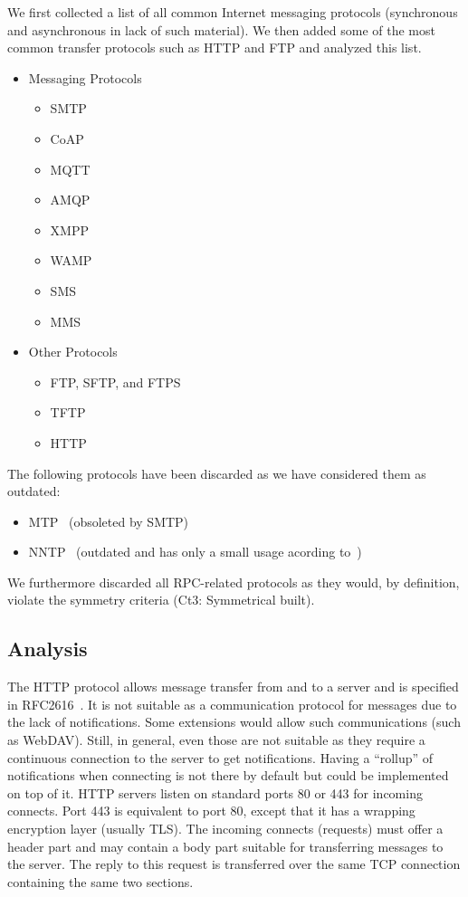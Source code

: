 We first collected a list of all common Internet messaging protocols (synchronous and asynchronous in lack of such material). We then added some of the most common transfer protocols such as HTTP and FTP and analyzed this list.

\begin{itemize}
	\item Messaging Protocols
	\begin{itemize}
		\item SMTP
		\item CoAP
		\item MQTT
		\item AMQP
		\item XMPP
		\item WAMP
		\item SMS
		\item MMS
	\end{itemize}
	\item Other Protocols
	\begin{itemize}
		\item FTP, SFTP, and FTPS
		\item TFTP
		\item HTTP
	\end{itemize}
\end{itemize}

The following protocols have been discarded as we have considered them as outdated:
\begin{itemize}
	\item MTP~\cite{rfc780} (obsoleted by SMTP)
	\item NNTP~\cite{rfc3977} (outdated and has only a small usage acording to~\cite{kim2010today})
\end{itemize}

We furthermore discarded all RPC-related protocols as they would, by definition, violate the symmetry criteria (Ct3: Symmetrical built).

\subsection{Analysis}
The HTTP protocol allows message transfer from and to a server and is specified in RFC2616~\cite{rfc2616}. It is not suitable as a communication protocol for messages due to the lack of notifications. Some extensions would allow such communications (such as WebDAV). Still, in general, even those are not suitable as they require a continuous connection to the server to get notifications. Having a ``rollup'' of notifications when connecting is not there by default but could be implemented on top of it. HTTP servers listen on standard ports 80 or 443 for incoming connects. Port 443 is equivalent to port 80, except that it has a wrapping encryption layer (usually TLS). The incoming connects (requests) must offer a header part and may contain a body part suitable for transferring messages to the server. The reply to this request is transferred over the same TCP connection containing the same two sections.

